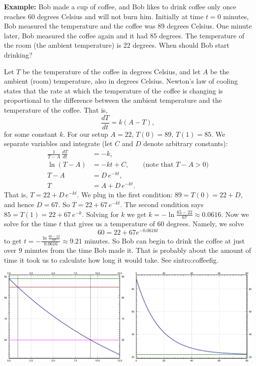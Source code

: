 \documentclass[10pt,aspectratio=169]{beamer}
\begin{document}

\begin{frame}

\textbf{Example:}
Bob made a cup of coffee, and
Bob likes to drink coffee only once reaches 60 degrees Celsius and will not burn him.
Initially at time $t=0$ minutes,
Bob measured the temperature and the coffee was 89 degrees Celsius.
One minute later, Bob measured the coffee again and it had 85 degrees.
The temperature of the room (the ambient temperature) is 22 degrees.
When should Bob start drinking?

Let $T$ be the temperature of the coffee in degrees Celsius, and let $A$ be
the ambient (room) temperature, also in degrees Celsius.
Newton's law of cooling states that the rate at which the
temperature of the coffee is changing
is proportional to the difference between the
ambient temperature and the temperature of the coffee.  That is,
\begin{equation*}
\frac{dT}{dt} = k(A-T) ,
\end{equation*}
for some constant $k$.
For our setup $A=22$, $T(0) = 89$, $T(1) = 85$.
We separate variables and integrate (let $C$ and $D$ denote arbitrary
constants):
\begin{align*}
\frac{1}{T-A} \, \frac{dT}{dt} & = -k , \\
\ln (T-A) &= -kt + C , \qquad \text{(note that } T-A > 0 \text{)} \\
T-A &= D\, e^{-kt} ,  \\
T &= A + D\, e^{-kt} .
\end{align*}
That is,
$T = 22 + D\, e^{-kt}$.  We plug in the first condition: $89 = T(0) = 22 +
D$,
and hence $D = 67$.  So
$T = 22 + 67\, e^{-kt}$.  The second condition says $85 = T(1) = 
22 + 67\, e^{-k}$.  Solving for $k$ we get
$k = - \ln \frac{85-22}{67} \approx 0.0616$.  Now we solve for the time $t$
that gives us a temperature of 60 degrees.  Namely, we solve
\begin{equation*}
60 = 22 + 67 e^{-0.0616t}
\end{equation*}
to get
$t = - \frac{\ln \frac{60-22}{67}}{0.0616} \approx 9.21$ minutes.  So Bob can
begin to drink the coffee at just over 9 minutes from the time Bob made
it.  That is probably about the amount of time it took us to calculate how long
it would take.  See {sintro:coffeefig}.

\includegraphics[width=6.24in]{../figures/coffeefig-1-2}


\end{frame}
\end{document}
